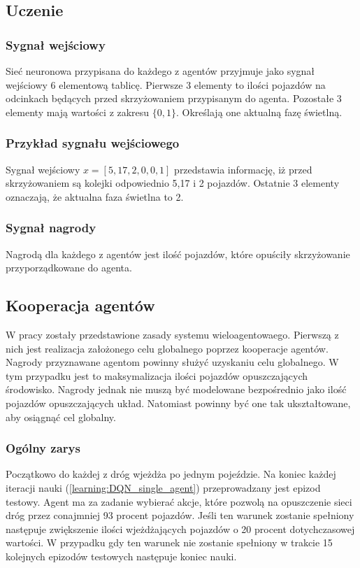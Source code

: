 \documentclass[12pt]{book}
\theoremstyle{plain}
\newcommand{\myref}[1]{(\ref{#1})}
\begin{document}
\subsection{Uczenie}
\subsubsection*{Sygnał wejściowy}
Sieć neuronowa przypisana do każdego z agentów przyjmuje jako sygnał wejściowy 6 elementową tablicę. Pierwsze 3 elementy to ilości pojazdów na odcinkach będących przed skrzyżowaniem przypisanym do agenta. Pozostałe 3 elementy mają wartości z zakresu $\{0,1\}$. Określają one aktualną fazę świetlną. 
\subsubsection*{Przykład sygnału wejściowego}
Sygnał wejściowy $x=[5,17,2,0,0,1]$ przedstawia informację, iż przed skrzyżowaniem są kolejki odpowiednio 5,17 i 2 pojazdów. Ostatnie 3 elementy oznaczają, że aktualna faza świetlna to 2.
\subsubsection*{Sygnał nagrody}
Nagrodą dla każdego z agentów jest ilość pojazdów, które opuściły skrzyżowanie przyporządkowane do agenta.
\subsection*{Kooperacja agentów}
W pracy \cite{wang2018cooperative} zostały przedstawione zasady systemu wieloagentowaego. Pierwszą z nich jest realizacja założonego celu globalnego poprzez kooperacje agentów. Nagrody przyznawane agentom powinny służyć uzyskaniu celu globalnego. W tym przypadku jest to maksymalizacja ilości pojazdów opuszczających środowisko. Nagrody jednak nie muszą być modelowane bezpośrednio jako ilość pojazdów opuszczających układ. Natomiast powinny być one tak ukształtowane, aby osiągnąć cel globalny. 
\subsubsection{Ogólny zarys}
Początkowo do każdej z dróg wjeżdża po jednym pojeździe. Na koniec każdej iteracji nauki \myref{learning:DQN_single_agent} przeprowadzany jest epizod testowy. Agent ma za zadanie wybierać akcje, które pozwolą na opuszczenie sieci dróg przez conajmniej 93 procent pojazdów. Jeśli ten warunek zostanie spełniony następuje zwiększenie ilości wjeżdżających pojazdów o 20 procent dotychczasowej wartości. W przypadku gdy ten warunek nie zostanie spełniony w trakcie 15 kolejnych epizodów testowych następuje koniec nauki. 
\end{document}
